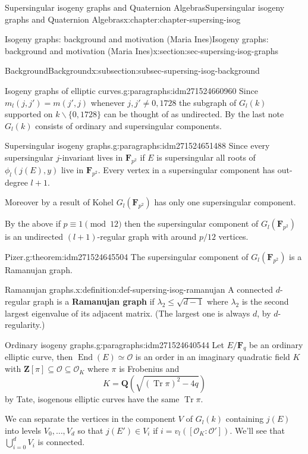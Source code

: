 \documentclass[oneside,10pt,]{book}
\newcommand{\terminology}[1]{\textbf{#1}}
\numberwithin{equation}{section}
\newcommand{\lb}{[}
\newcommand{\rb}{]}
\newcommand{\ZZ}{\mathbf{Z}}
\newcommand{\QQ}{\mathbf{Q}}
\newcommand{\FF}{\mathbf{F}}
\newcommand{\ints}{\mathcal{O}}
\DeclareMathOperator{\End}{End}
\DeclareMathOperator{\trace}{Tr}
\begin{document}
\begin{chapterptx}{Supersingular isogeny graphs and Quaternion Algebras}{}{Supersingular isogeny graphs and Quaternion Algebras}{}{}{x:chapter:chapter-supersing-isog}
\begin{sectionptx}{Isogeny graphs: background and motivation (Maria Ines)}{}{Isogeny graphs: background and motivation (Maria Ines)}{}{}{x:section:sec-supersing-isog-graphs}
\begin{subsectionptx}{Background}{}{Background}{}{}{x:subsection:subsec-supersing-isog-background}
\begin{paragraphs}{Isogeny graphs of elliptic curves.}{g:paragraphs:idm271524660960}
Since \(m_l(j,j') =  m(j',j)\) whenever \(j,j' \ne  0,1728\) the subgraph of \(G_l(k)\) supported on \(k\smallsetminus \{0,1728\}\) can be thought of as undirected. By the last note \(G_l(k)\) consists of ordinary and supersingular components.%
\end{paragraphs}%
\begin{paragraphs}{Supersingular isogeny graphs.}{g:paragraphs:idm271524651488}%
Since every supersingular \(j\)-invariant lives in \(\FF_{p^2}\) if \(E\) is supersingular all roots of \(\phi_l(j(E), y)\) live in \(\FF_{p^2}\). Every vertex in a supersingular component has out-degree \(l+1\).%
\par
Moreover by a result of Kohel \(G_l(\FF_{p^2})\) has only one supersingular component.%
\par
By the above if \(p \equiv 1 \pmod {12}\) then the supersingular component of \(G_l(\FF_{p^2})\) is an undirected \((l+1)\)-regular graph with around \(p/12\) vertices.%
\begin{theorem}{Pizer.}{}{g:theorem:idm271524645504}%
The supersingular component of \(G_l(\FF_{p^2})\) is a Ramanujan graph.%
\end{theorem}
\begin{definition}{Ramanujan graphs.}{x:definition:def-supersing-isog-ramanujan}%
A connected \(d\)-regular graph is a \terminology{Ramanujan graph} if \(\lambda_2 \le \sqrt{d-1}\) where \(\lambda_2\) is the second largest eigenvalue of its adjacent matrix. (The largest one is always \(d\), by \(d\)-regularity.)%
\end{definition}
\end{paragraphs}%
\begin{paragraphs}{Ordinary isogeny graphs.}{g:paragraphs:idm271524640544}%
Let \(E/\FF_q\) be an ordinary elliptic curve, then \(\End(E) \simeq \ints\) is an order in an imaginary quadratic field \(K\) with \(\ZZ\lb \pi \rb \subseteq \ints \subseteq \ints_K\) where \(\pi\) is Frobenius and%
\begin{equation*}
K = \QQ(\sqrt{(\trace \pi)^2 - 4q})
\end{equation*}
by Tate, isogenous elliptic curves have the same \(\trace \pi\).%
\par
We can separate the vertices in the component \(V\) of \(G_l(k)\) containing \(j(E)\) into levels \(V_0, \ldots, V_d\) so that \(j(E') \in V_i\) if \(i = v_l(\lb \ints_K : \ints'\rb)\). We'll see that \(\bigcup_{i=0}^d V_i\) is connected.%
\par

\end{paragraphs}
\end{subsectionptx}
\end{sectionptx}
\end{chapterptx}
\end{document}
